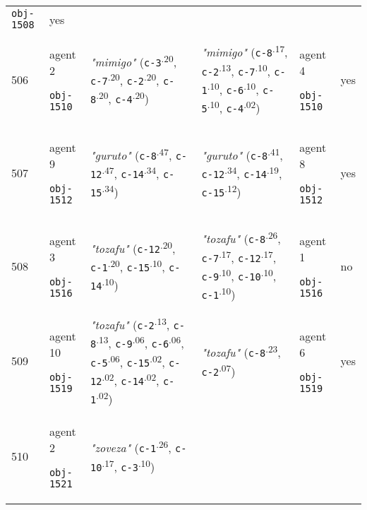 {\begin{tabular}{p{0.4cm}p{1.4cm}p{7cm}p{7cm}p{1.4cm}p{0.6cm}}
 \texttt{obj-1508} & yes \\
506 & agent 2 

\texttt{obj-1510} &\textit{"mimigo"} (\texttt{c-3}\textsuperscript{.20}, \texttt{c-7}\textsuperscript{.20}, \texttt{c-2}\textsuperscript{.20}, \texttt{c-8}\textsuperscript{.20}, \texttt{c-4}\textsuperscript{.20}) & \textit{"mimigo"} (\texttt{c-8}\textsuperscript{.17}, \texttt{c-2}\textsuperscript{.13}, \texttt{c-7}\textsuperscript{.10}, \texttt{c-1}\textsuperscript{.10}, \texttt{c-6}\textsuperscript{.10}, \texttt{c-5}\textsuperscript{.10}, \texttt{c-4}\textsuperscript{.02}) & agent 4 

 \texttt{obj-1510} & yes \\
507 & agent 9 

\texttt{obj-1512} &\textit{"guruto"} (\texttt{c-8}\textsuperscript{.47}, \texttt{c-12}\textsuperscript{.47}, \texttt{c-14}\textsuperscript{.34}, \texttt{c-15}\textsuperscript{.34}) & \textit{"guruto"} (\texttt{c-8}\textsuperscript{.41}, \texttt{c-12}\textsuperscript{.34}, \texttt{c-14}\textsuperscript{.19}, \texttt{c-15}\textsuperscript{.12}) & agent 8 

 \texttt{obj-1512} & yes \\
508 & agent 3 

\texttt{obj-1516} &\textit{"tozafu"} (\texttt{c-12}\textsuperscript{.20}, \texttt{c-1}\textsuperscript{.20}, \texttt{c-15}\textsuperscript{.10}, \texttt{c-14}\textsuperscript{.10}) & \textit{"tozafu"} (\texttt{c-8}\textsuperscript{.26}, \texttt{c-7}\textsuperscript{.17}, \texttt{c-12}\textsuperscript{.17}, \texttt{c-9}\textsuperscript{.10}, \texttt{c-10}\textsuperscript{.10}, \texttt{c-1}\textsuperscript{.10}) & agent 1 

 \texttt{obj-1516} & no \\
509 & agent 10 

\texttt{obj-1519} &\textit{"tozafu"} (\texttt{c-2}\textsuperscript{.13}, \texttt{c-8}\textsuperscript{.13}, \texttt{c-9}\textsuperscript{.06}, \texttt{c-6}\textsuperscript{.06}, \texttt{c-5}\textsuperscript{.06}, \texttt{c-15}\textsuperscript{.02}, \texttt{c-12}\textsuperscript{.02}, \texttt{c-14}\textsuperscript{.02}, \texttt{c-1}\textsuperscript{.02}) & \textit{"tozafu"} (\texttt{c-8}\textsuperscript{.23}, \texttt{c-2}\textsuperscript{.07}) & agent 6 

 \texttt{obj-1519} & yes \\
510 & agent 2 

\texttt{obj-1521} &\textit{"zoveza"} (\texttt{c-1}\textsuperscript{.26}, \texttt{c-10}\textsuperscript{.17}, \texttt{c-3}\textsuperscript{.10})


\end{tabular}}
